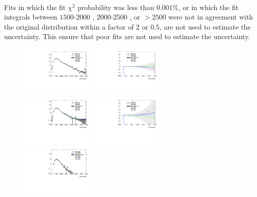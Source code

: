 \paragraph{}
Fits in which the fit $\chi^2$ probability was less than $0.001\%$, or in which the fit integrals between $1500$-$2000$ \GeV, $2000$-$2500$ \GeV, or $>2500$ \GeV were not in agreement with the original distribution within a factor of $2$ or $0.5$, are not used to estimate the uncertainty. This ensure that poor fits are not used to estimate the uncertainty.

\begin{figure}[htb!]
\begin{center}
\includegraphics[width=0.31\textwidth,angle=-90]{figures/boosted/Syst_Smooth/smoothFuncRangeCompare_22_comp.pdf}
\includegraphics[width=0.31\textwidth,angle=-90]{figures/boosted/Syst_Smooth/smoothFuncRangeCompare_22_comp_ratio.pdf} \\
\includegraphics[width=0.31\textwidth,angle=-90]{figures/boosted/Syst_Smooth/smoothFuncRangeCompare_33_comp.pdf}
\includegraphics[width=0.31\textwidth,angle=-90]{figures/boosted/Syst_Smooth/smoothFuncRangeCompare_33_comp_ratio.pdf} \\
\includegraphics[width=0.31\textwidth,angle=-90]{figures/boosted/Syst_Smooth/smoothFuncRangeCompare_44_comp.pdf}

\end{center}
\end{figure}
